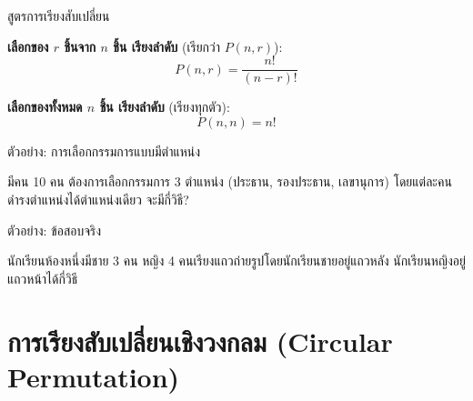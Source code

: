 \documentclass[11pt, aspectratio=169]{beamer}
\begin{document}
\begin{frame}{สูตรการเรียงสับเปลี่ยน}
  \begin{explanation}[สูตร]
    \textbf{เลือกของ $r$ ชิ้นจาก $n$ ชิ้น เรียงลำดับ} (เรียกว่า $P(n, r)$):
    \[
      P(n, r) = \frac{n!}{(n-r)!}
    \]

    \medskip
    \textbf{เลือกของทั้งหมด $n$ ชิ้น เรียงลำดับ} (เรียงทุกตัว):
    \[
      P(n, n) = n!
    \]
  \end{explanation}
\end{frame}

\begin{frame}[t]{ตัวอย่าง: การเลือกกรรมการแบบมีตำแหน่ง}
  \begin{exambox}[โจทย์]
    มีคน 10 คน ต้องการเลือกกรรมการ 3 ตำแหน่ง (ประธาน, รองประธาน, เลขานุการ)
    โดยแต่ละคนดำรงตำแหน่งได้ตำแหน่งเดียว จะมีกี่วิธี?
  \end{exambox}

  \vspace{\fill}
\end{frame}

\begin{frame}[t]{ตัวอย่าง: ข้อสอบจริง}
  \begin{exambox}[โจทย์ปี 67 ข้อ 31]
    นักเรียนห้องหนึ่งมีชาย 3 คน หญิง 4 คนเรียงแถวถ่ายรูปโดยนักเรียนชายอยู่แถวหลัง นักเรียนหญิงอยู่แถวหน้าได้กี่วิธี
  \end{exambox}

  \vspace{\fill}
\end{frame}

\section{การเรียงสับเปลี่ยนเชิงวงกลม (Circular Permutation)}
\end{document}
